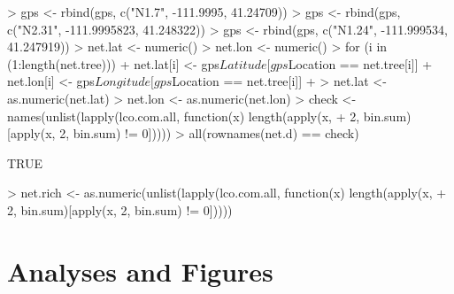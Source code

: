 \documentclass[12pt]{article}
\begin{document}
\begin{Schunk}
\begin{Sinput}
> gps <- rbind(gps, c("N1.7", -111.9995, 41.24709))
> gps <- rbind(gps, c("N2.31", -111.9995823, 41.248322))
> gps <- rbind(gps, c("N1.24", -111.999534, 41.247919))
> net.lat <- numeric()
> net.lon <- numeric()
> for (i in (1:length(net.tree))) {
+     net.lat[i] <- gps$Latitude[gps$Location == net.tree[i]]
+     net.lon[i] <- gps$Longitude[gps$Location == net.tree[i]]
+ }
> net.lat <- as.numeric(net.lat)
> net.lon <- as.numeric(net.lon)
> check <- names(unlist(lapply(lco.com.all, function(x) length(apply(x, 
+     2, bin.sum)[apply(x, 2, bin.sum) != 0]))))
> all(rownames(net.d) == check)
\end{Sinput}
\begin{Soutput}
[1] TRUE
\end{Soutput}
\begin{Sinput}
> net.rich <- as.numeric(unlist(lapply(lco.com.all, function(x) length(apply(x, 
+     2, bin.sum)[apply(x, 2, bin.sum) != 0]))))
\end{Sinput}
\end{Schunk}

\section{Analyses and Figures}

\begin{Schunk}
\end{Schunk}
\end{document}
